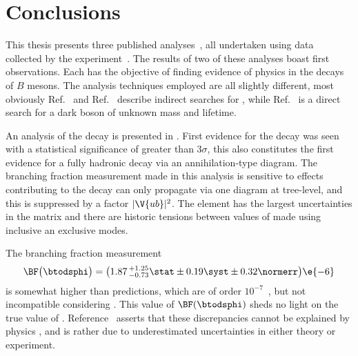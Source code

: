 \chapter{Conclusions}
\label{ch:conc}

This thesis presents three published
analyses~\cite{LHCb-PAPER-2012-025,LHCb-PAPER-2014-030,LHCb-PAPER-2015-036}, all
undertaken using data collected by the \lhcb experiment~\cite{Alves:2008zz}.
The results of two of these analyses boast first observations.
Each has the objective of finding evidence of physics \bsm in the decays of $B$ mesons.
The analysis techniques employed are all slightly different, most obviously
Ref.~\cite{LHCb-PAPER-2012-025} and Ref.~\cite{LHCb-PAPER-2014-030} describe indirect
searches for \np, while Ref.~\cite{LHCb-PAPER-2015-036} is a direct search for a dark boson of
unknown mass and lifetime.

An analysis of the decay \btodsphi is presented in .
First evidence for the decay was seen with a statistical significance of greater than $3\sigma$,
this also constitutes the first evidence for a fully hadronic decay via an annihilation-type
diagram.
The branching fraction measurement made in this analysis is sensitive to \np effects contributing
to the decay \btodsphi can only propagate via one diagram at tree-level, and this is suppressed by
a factor $|\V{ub}|^2$.
The element  has the largest uncertainties in the \ckm matrix and there are historic tensions
between values of  made using inclusive an exclusive modes.

The branching fraction measurement
\begin{equation*}
  \BF\big(\btodsphi\big) =
  \big(1.87\,^{+1.25}_{-0.73}\stat\pm0.19\syst\pm0.32\normerr\big)\e{-6}
\end{equation*}
is somewhat higher than \sm predictions, which are
of order $10^{-7}$~\cite{Zou:2009zza,Mohanta:2002wf,PhysRevD.76.057701,Lu:2001yz}, but
not incompatible considering .
This value of $\BF(\btodsphi)$ sheds no light on the true value of .
Reference~\cite{Crivellin:2014zpa} asserts that these
discrepancies cannot be explained by physics \bsm, and is rather due to underestimated
uncertainties in either theory or experiment.

